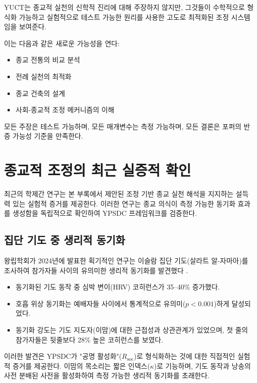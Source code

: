 \documentclass[12pt,a4paper]{article}
\begin{document}
	YUCT는 종교적 실천의 신학적 진리에 대해 주장하지 않지만, 그것들이 수학적으로 형식화 가능하고 실험적으로 테스트 가능한 원리를 사용한 고도로 최적화된 조정 시스템임을 보여준다.
	
	이는 다음과 같은 새로운 가능성을 연다:
	\begin{itemize}
		\item 종교 전통의 비교 분석
		\item 전례 실천의 최적화
		\item 종교 건축의 설계
		\item 사회-종교적 조정 메커니즘의 이해
	\end{itemize}
	
	모든 주장은 테스트 가능하며, 모든 매개변수는 측정 가능하며, 모든 결론은 포퍼의 반증 가능성 기준을 만족한다.
	
	\section{종교적 조정의 최근 실증적 확인}
	\label{sec:recent-studies}
	
	최근의 학제간 연구는 본 부록에서 제안된 조정 기반 종교 실천 해석을 지지하는 설득력 있는 실험적 증거를 제공한다. 이러한 연구는 종교 의식이 측정 가능한 동기화 효과를 생성함을 독립적으로 확인하여 YPSDC 프레임워크를 검증한다.
	
	\subsection{집단 기도 중 생리적 동기화}
	
	왕립학회가 2024년에 발표한 획기적인 연구는 이슬람 집단 기도(살라트 알-자마아)를 조사하여 참가자들 사이의 유의미한 생리적 동기화를 발견했다 \cite{RoyalSociety2024}.
	\begin{itemize}
		\item 동기화된 기도 동작 중 심박 변이(HRV) 코히런스가 35–40\% 증가했다.
		\item 호흡 위상 동기화는 예배자들 사이에서 통계적으로 유의미($p < 0.001$)하게 달성되었다.
		\item 동기화 강도는 기도 지도자(이맘)에 대한 근접성과 상관관계가 있었으며, 첫 줄의 참가자들은 뒷줄보다 28\% 높은 코히런스를 보였다.
	\end{itemize}
	
	이러한 발견은 YPSDC가 "공명 활성화"($R_{\mathrm{soc}}$)로 형식화하는 것에 대한 직접적인 실험적 증거를 제공한다. 이맘의 목소리는 짧은 인덱스($\kappa$)로 기능하며, 기도 동작과 낭송의 사전 분배된 사전을 활성화하여 측정 가능한 생리적 동기화를 초래한다.
	
\end{document}
